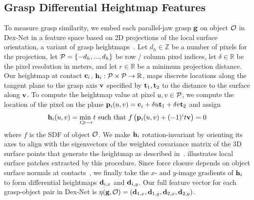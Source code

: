 
\subsection{Grasp Differential Heightmap Features}
To measure grasp similarity, we embed each parallel-jaw grasp $\mathbf{g}$ on object $\mathcal{O}$ in Dex-Net in a feature space based on 2D projections of the local surface orientation, a variant of grasp heightmaps~\cite{herzog2014learning, kappler2015leveraging}.
Let $d_h \in \mathbb{Z}$ be a number of pixels for the projection, let $\mathcal{P} = \{-d_h, ..., d_h\}$ be row / column pixel indices, let $\delta \in \mathbb{R}$ be the pixel resolution in meters, and let $r \in \mathbb{R}$ be a minimum projection distance.
Our heightmap at contact $\mathbf{c}_i$, $\mathbf{h}_{i}: \mathcal{P} \times \mathcal{P} \rightarrow \mathbb{R}$, maps discrete locations along the tangent plane to the grasp axis $\mathbf{v}$ specified by $\mathbf{t}_1, \mathbf{t}_2$ to the distance to the surface along $\mathbf{v}$.
To compute the heightmap value at pixel $u,v \in \mathcal{P}$, we compute the location of the pixel on the plane $\mathbf{p}_i(u,v) = \mathbf{c}_i + \delta u \mathbf{t}_1 + \delta v \mathbf{t}_2$ and assign
\begin{align*}
	\mathbf{h}_i(u,v) = \underset{t \geqslant -r}{\text{min }} t \text{ such that } f\left( \mathbf{p}_i(u,v) + (-1)^{i} t \mathbf{v} \right) = 0
\end{align*}
\noindent where $f$ is the SDF of object $\mathcal{O}$. 
We make $\mathbf{h}_i$ rotation-invariant by orienting its axes to align with the eigenvectors of the weighted covariance matrix of the 3D surface points that generate the heightmap as described in~\cite{salti2014shot}.
 illustrates local surface patches extracted by this procedure.
Since force closure depends on object surface normals at contacts~\cite{pokorny2013c}, we finally take the $x$- and $y$-image gradients of $\mathbf{h}_i$ to form differential heightmaps $\mathbf{d}_{i,x}$ and $\mathbf{d}_{i,y}$.
Our full feature vector for each grasp-object pair  in Dex-Net is $\eta(\mathbf{g}, \mathcal{O}) = (\mathbf{d}_{1,x}, \mathbf{d}_{1,y}, \mathbf{d}_{2,x}, \mathbf{d}_{2,y})$.

